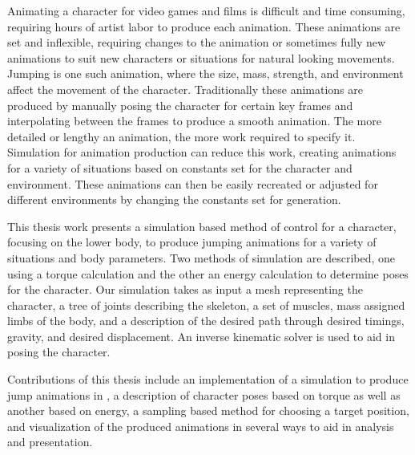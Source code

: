 
Animating a character for video games and films is difficult and time consuming, requiring hours of artist labor to produce each animation.  These animations are set and inflexible, requiring changes to the animation or sometimes fully new animations to suit new characters or situations for natural looking movements.  Jumping is one such animation, where the size, mass, strength, and environment affect the movement of the character.  Traditionally these animations are produced by manually posing the character for certain key frames and interpolating between the frames to produce a smooth animation.  The more detailed or lengthy an animation, the more work required to specify it.  Simulation for animation production can reduce this work, creating animations for a variety of situations based on constants set for the character and environment.  These animations can then be easily recreated or adjusted for different environments by changing the constants set for generation.

This thesis work presents a simulation based method of control for a character, focusing on the lower body, to produce jumping animations for a variety of situations and body parameters.  Two methods of simulation are described, one using a torque calculation and the other an energy calculation to determine poses for the character.  Our simulation takes as input a mesh representing the character, a tree of joints describing the skeleton, a set of muscles, mass assigned limbs of the body, and a description of the desired path through desired timings, gravity, and desired displacement.  An inverse kinematic solver is used to aid in posing the character.

Contributions of this thesis include an implementation of a simulation to produce jump animations in \unity{}, a description of character poses based on torque as well as another based on energy, a sampling based method for choosing a target position, and visualization of the produced animations in several ways to aid in analysis and presentation.

